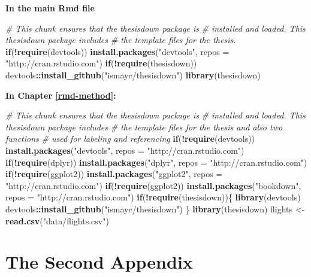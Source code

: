 \documentclass[12pt,oneside]{reedthesis}
\newenvironment{Shaded}{\begin{snugshade}}{\end{snugshade}}
\newcommand{\CommentTok}[1]{\textcolor[rgb]{0.56,0.35,0.01}{\textit{#1}}}
\newcommand{\ControlFlowTok}[1]{\textcolor[rgb]{0.13,0.29,0.53}{\textbf{#1}}}
\newcommand{\DataTypeTok}[1]{\textcolor[rgb]{0.13,0.29,0.53}{#1}}
\newcommand{\KeywordTok}[1]{\textcolor[rgb]{0.13,0.29,0.53}{\textbf{#1}}}
\newcommand{\NormalTok}[1]{#1}
\newcommand{\OperatorTok}[1]{\textcolor[rgb]{0.81,0.36,0.00}{\textbf{#1}}}
\newcommand{\StringTok}[1]{\textcolor[rgb]{0.31,0.60,0.02}{#1}}
\begin{document}
\textbf{In the main Rmd file}
\begin{Shaded}
\begin{Highlighting}[]
\CommentTok{# This chunk ensures that the thesisdown package is}
\CommentTok{# installed and loaded. This thesisdown package includes}
\CommentTok{# the template files for the thesis.}
\ControlFlowTok{if}\NormalTok{(}\OperatorTok{!}\KeywordTok{require}\NormalTok{(devtools))}
  \KeywordTok{install.packages}\NormalTok{(}\StringTok{"devtools"}\NormalTok{, }\DataTypeTok{repos =} \StringTok{"http://cran.rstudio.com"}\NormalTok{)}
\ControlFlowTok{if}\NormalTok{(}\OperatorTok{!}\KeywordTok{require}\NormalTok{(thesisdown))}
\NormalTok{  devtools}\OperatorTok{::}\KeywordTok{install_github}\NormalTok{(}\StringTok{"ismayc/thesisdown"}\NormalTok{)}
\KeywordTok{library}\NormalTok{(thesisdown)}
\end{Highlighting}
\end{Shaded}
\textbf{In Chapter \ref{rmd-method}:}
\begin{Shaded}
\begin{Highlighting}[]
\CommentTok{# This chunk ensures that the thesisdown package is}
\CommentTok{# installed and loaded. This thesisdown package includes}
\CommentTok{# the template files for the thesis and also two functions}
\CommentTok{# used for labeling and referencing}
\ControlFlowTok{if}\NormalTok{(}\OperatorTok{!}\KeywordTok{require}\NormalTok{(devtools))}
  \KeywordTok{install.packages}\NormalTok{(}\StringTok{"devtools"}\NormalTok{, }\DataTypeTok{repos =} \StringTok{"http://cran.rstudio.com"}\NormalTok{)}
\ControlFlowTok{if}\NormalTok{(}\OperatorTok{!}\KeywordTok{require}\NormalTok{(dplyr))}
    \KeywordTok{install.packages}\NormalTok{(}\StringTok{"dplyr"}\NormalTok{, }\DataTypeTok{repos =} \StringTok{"http://cran.rstudio.com"}\NormalTok{)}
\ControlFlowTok{if}\NormalTok{(}\OperatorTok{!}\KeywordTok{require}\NormalTok{(ggplot2))}
    \KeywordTok{install.packages}\NormalTok{(}\StringTok{"ggplot2"}\NormalTok{, }\DataTypeTok{repos =} \StringTok{"http://cran.rstudio.com"}\NormalTok{)}
\ControlFlowTok{if}\NormalTok{(}\OperatorTok{!}\KeywordTok{require}\NormalTok{(ggplot2))}
    \KeywordTok{install.packages}\NormalTok{(}\StringTok{"bookdown"}\NormalTok{, }\DataTypeTok{repos =} \StringTok{"http://cran.rstudio.com"}\NormalTok{)}
\ControlFlowTok{if}\NormalTok{(}\OperatorTok{!}\KeywordTok{require}\NormalTok{(thesisdown))\{}
  \KeywordTok{library}\NormalTok{(devtools)}
\NormalTok{  devtools}\OperatorTok{::}\KeywordTok{install_github}\NormalTok{(}\StringTok{"ismayc/thesisdown"}\NormalTok{)}
\NormalTok{  \}}
\KeywordTok{library}\NormalTok{(thesisdown)}
\NormalTok{flights <-}\StringTok{ }\KeywordTok{read.csv}\NormalTok{(}\StringTok{"data/flights.csv"}\NormalTok{)}
\end{Highlighting}
\end{Shaded}
\hypertarget{the-second-appendix}{%
\chapter{The Second Appendix}\label{the-second-appendix}}
\end{document}
